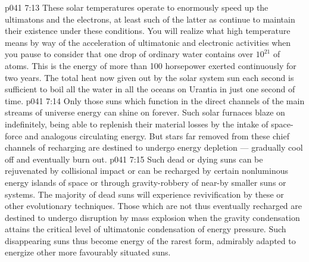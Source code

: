 \vs p041 7:13 These solar temperatures operate to enormously speed up the ultimatons and the electrons, at least such of the latter as continue to maintain their existence under these conditions. You will realize what high temperature means by way of the acceleration of ultimatonic and electronic activities when you pause to consider that one drop of ordinary water contains over $10^{21}$ of atoms. This is the energy of more than 100 horsepower exerted continuously for two years. The total heat now given out by the solar system sun each second is sufficient to boil all the water in all the oceans on Urantia in just one second of time.
\vs p041 7:14 \pc Only those suns which function in the direct channels of the main streams of universe energy can shine on forever. Such solar furnaces blaze on indefinitely, being able to replenish their material losses by the intake of space\hyp{}force and analogous circulating energy. But stars far removed from these chief channels of recharging are destined to undergo energy depletion --- gradually cool off and eventually burn out.
\vs p041 7:15 Such dead or dying suns can be rejuvenated by collisional impact or can be recharged by certain nonluminous energy islands of space or through gravity\hyp{}robbery of near-by smaller suns or systems. The majority of dead suns will experience revivification by these or other evolutionary techniques. Those which are not thus eventually recharged are destined to undergo disruption by mass explosion when the gravity condensation attains the critical level of ultimatonic condensation of energy pressure. Such disappearing suns thus become energy of the rarest form, admirably adapted to energize other more favourably situated suns.
